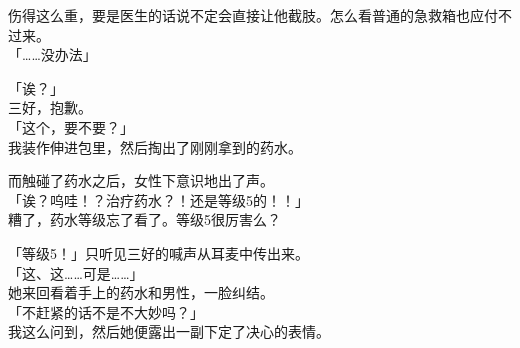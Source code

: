 伤得这么重，要是医生的话说不定会直接让他截肢。怎么看普通的急救箱也应付不过来。\\

「……没办法」

「诶？」\\

三好，抱歉。\\

「这个，要不要？」\\

我装作伸进包里，然后掏出了刚刚拿到的药水。

而触碰了药水之后，女性下意识地出了声。\\

「诶？呜哇！？治疗药水？！还是等级5的！！」\\

糟了，药水等级忘了看了。等级5很厉害么？

「等级5！」只听见三好的喊声从耳麦中传出来。\\

「这、这……可是……」\\

她来回看着手上的药水和男性，一脸纠结。\\

「不赶紧的话不是不大妙吗？」\\

我这么问到，然后她便露出一副下定了决心的表情。\\

